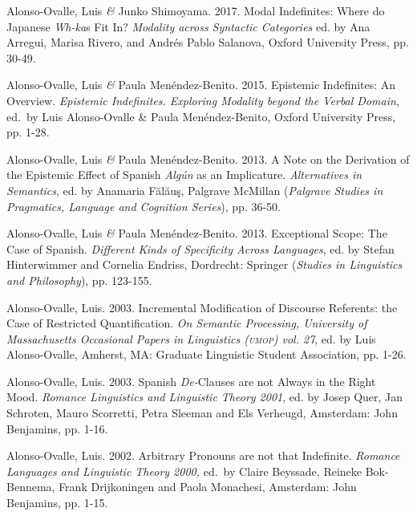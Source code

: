 \documentclass[11pt]{article}
\begin{document}
Alonso-Ovalle, Luis \textit{\&} Junko Shimoyama. 2017. Modal Indefinites: Where do Japanese \textit{Wh-ka}s Fit In? \textit{Modality across Syntactic Categories} ed. by Ana Arregui, Marisa Rivero, and Andr\'es Pablo Salanova, Oxford University Press,  pp. 30-49.

Alonso-Ovalle, Luis \textit{\&} Paula Men\'endez-Benito. 2015. Epistemic Indefinites: An Overview. \textit{Epistemic Indefinites. Exploring Modality beyond the Verbal Domain}, ed.\ by Luis Alonso-Ovalle \& Paula Men\'endez-Benito, Oxford University Press, pp. 1-28.

Alonso-Ovalle, Luis \textit{\&} Paula Men\'endez-Benito. 2013. A Note on the Derivation of the Epistemic Effect of Spanish
\textit{Alg\'un} as an Implicature. \textit{Alternatives in Semantics}, ed. by
Anamaria F\u{a}l\u{a}u\c{s}, Palgrave McMillan (\textit{Palgrave
  Studies in Pragmatics, Language and Cognition Series}), pp. 36-50.

Alonso-Ovalle, Luis \textit{\&} Paula Men\'endez-Benito. 2013. Exceptional Scope: The Case of Spanish. \textit{Different Kinds of Specificity Across Languages}, ed. by
Stefan Hinterwimmer and Cornelia Endriss, Dordrecht: Springer
(\textit{Studies in Linguistics and Philosophy}), pp. 123-155.

Alonso-Ovalle, Luis. 2003. Incremental Modification of Discourse Referents: the Case of Restricted Quantification. \textit{On Semantic Processing, University of Massachusetts Occasional Papers in Linguistics (\textsc{umop}) vol. 27}, ed. by Luis Alonso-Ovalle, Amherst, MA: Graduate Linguistic Student Association, pp. 1-26.

Alonso-Ovalle, Luis. 2003. Spanish {\it De-}Clauses are not Always in the Right Mood. {\it Romance Linguistics and Linguistic Theory 2001}, ed. by Josep Quer, Jan Schroten, Mauro Scorretti, Petra Sleeman and Els Verheugd, Amsterdam: John Benjamins, pp. 1-16. 

Alonso-Ovalle, Luis. 2002. Arbitrary Pronouns are not that Indefinite.  {\it Romance Languages and Linguistic Theory 2000,} ed.\ by Claire Beyssade, Reineke Bok-Bennema, Frank Drijkoningen and Paola Monachesi, Amsterdam: John Benjamins, pp. 1-15. 
\end{document}
